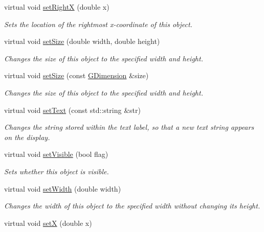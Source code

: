 \begin{DoxyCompactItemize}
virtual void \mbox{\hyperlink{classsgl_1_1GObject_a3c90b758cdc2c911c9ef76c4360eb912}{set\+RightX}} (double x)
\begin{DoxyCompactList}\small\item\em Sets the location of the rightmost x-\/coordinate of this object. \end{DoxyCompactList}\item 
virtual void \mbox{\hyperlink{classsgl_1_1GObject_aca25d49481f9bf5fc8f7df4c086c4ce7}{set\+Size}} (double width, double height)
\begin{DoxyCompactList}\small\item\em Changes the size of this object to the specified width and height. \end{DoxyCompactList}\item 
virtual void \mbox{\hyperlink{classsgl_1_1GObject_ae2b628228f192c2702c4ce941b2af68f}{set\+Size}} (const \mbox{\hyperlink{structsgl_1_1GDimension}{G\+Dimension}} \&size)
\begin{DoxyCompactList}\small\item\em Changes the size of this object to the specified width and height. \end{DoxyCompactList}\item 
virtual void \mbox{\hyperlink{classsgl_1_1GText_ac98cbe102af8aaf8fd017228d645bfda}{set\+Text}} (const std\+::string \&str)
\begin{DoxyCompactList}\small\item\em Changes the string stored within the text label, so that a new text string appears on the display. \end{DoxyCompactList}\item 
virtual void \mbox{\hyperlink{classsgl_1_1GObject_a88203f28224315d9f4471212f4af8ed3}{set\+Visible}} (bool flag)
\begin{DoxyCompactList}\small\item\em Sets whether this object is visible. \end{DoxyCompactList}\item 
virtual void \mbox{\hyperlink{classsgl_1_1GObject_aa3f3fba4cb131baa8696ba01e3bceca1}{set\+Width}} (double width)
\begin{DoxyCompactList}\small\item\em Changes the width of this object to the specified width without changing its height. \end{DoxyCompactList}\item 
virtual void \mbox{\hyperlink{classsgl_1_1GObject_a9c18fcc579333bf9653d13ad2b372e39}{setX}} (double x)

\end{DoxyCompactItemize}
